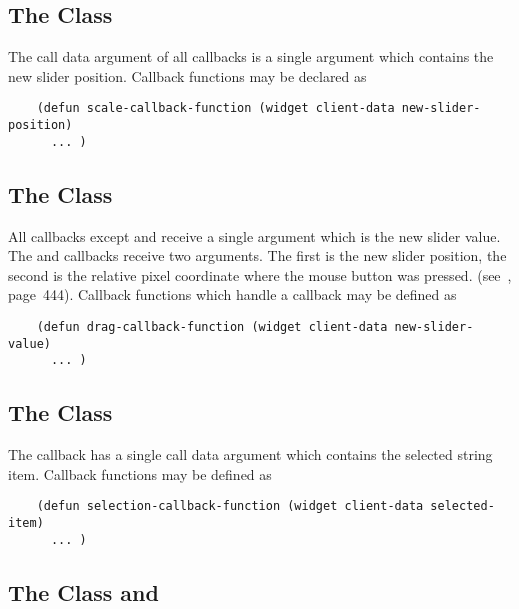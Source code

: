 \subsection{The Class }

The call data argument of all callbacks is a single argument which contains the
new slider position. Callback functions may be declared as

\fnsize\begin{verbatim}
    (defun scale-callback-function (widget client-data new-slider-position)
      ... )
\end{verbatim}\normalsize

\subsection{The Class }

All callbacks except  and  receive a single argument
which is the new slider value.  The  and  callbacks
receive two arguments.  The first is the new slider position, the second is the
relative pixel coordinate where the mouse button was pressed. 
(see~\cite{motif-prog-ref}, page~444). Callback functions which handle
a  callback may be defined as

\begin{verbatim}
    (defun drag-callback-function (widget client-data new-slider-value)
      ... )
\end{verbatim}

\subsection{The Class }

The  callback has a single call data argument which contains the
selected string item. Callback functions may be defined as

\begin{verbatim}
    (defun selection-callback-function (widget client-data selected-item)
      ... )
\end{verbatim}

\subsection{The Class  and }

